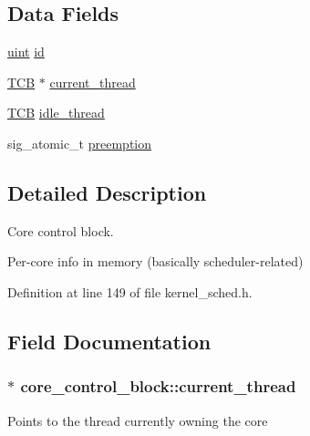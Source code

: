 \subsection*{Data Fields}
\begin{DoxyCompactItemize}
\item 
\hyperlink{bios_8h_a91ad9478d81a7aaf2593e8d9c3d06a14}{uint} \hyperlink{structcore__control__block_a5208867f309bdd1656fd473f38b30bfe}{id}
\item 
\hyperlink{group__scheduler_gaf88d9c946bf70b36a1e8bc34383abfc9}{T\+CB} $\ast$ \hyperlink{structcore__control__block_aac649db5b9a99e693ed21c7e610834bf}{current\+\_\+thread}
\item 
\hyperlink{group__scheduler_gaf88d9c946bf70b36a1e8bc34383abfc9}{T\+CB} \hyperlink{structcore__control__block_a6dd29dab4a95ce740f45370345408c52}{idle\+\_\+thread}
\item 
sig\+\_\+atomic\+\_\+t \hyperlink{structcore__control__block_a858cde45d4478d73f60e839594b363f4}{preemption}
\end{DoxyCompactItemize}


\subsection{Detailed Description}
Core control block. 

Per-\/core info in memory (basically scheduler-\/related) 

Definition at line 149 of file kernel\+\_\+sched.\+h.



\subsection{Field Documentation}
\subsubsection[{\texorpdfstring{current\+\_\+thread}{current_thread}}]{$\ast$ core\+\_\+control\+\_\+block\+::current\+\_\+thread}\hypertarget{structcore__control__block_aac649db5b9a99e693ed21c7e610834bf}{}\label{structcore__control__block_aac649db5b9a99e693ed21c7e610834bf}
Points to the thread currently owning the core 

